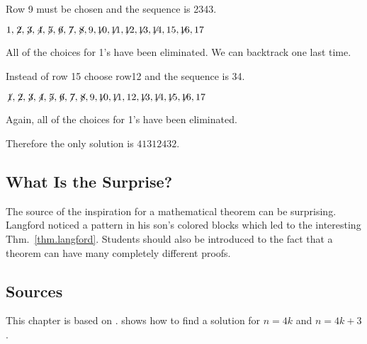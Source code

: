 \noindent Row 9 must be chosen and the sequence is 2{}34{}3.

$1,\not\! 2,\not\! 3,\not\! 4,\not\! 5,\not\! 6,\not\! 7,\not\! 8,9,\not\!\! 10,\not\!\! 11,\not\!\! 12,\not\!\! 13,\not\!\! 14,15,\not\!\! 16,17$

\noindent All of the choices for 1's have been eliminated. We can backtrack one last time. 

\smallskip

\noindent Instead of row 15 choose row12 and the sequence is 3{}4\textvisiblespace {}.

$\not\! 1,\not\! 2,\not\! 3,\not\! 4,\not\! 5,\not\! 6,\not\! 7,\not\! 8,9,\not\!\! 10,\not\!\! 11,12,\not\!\! 13,\not\!\! 14,\not\!\! 15,\not\!\! 16,17$

\noindent Again, all of the choices for 1's have been eliminated.

\medskip

\noindent Therefore the only solution is $41312432$.

\subsection*{What Is the Surprise?}

The source of the inspiration for a mathematical theorem can be surprising. Langford noticed a pattern in his son's colored blocks which led to the interesting Thm.~\ref{thm.langford}. Students should also be introduced to the fact that a theorem  can have many completely different proofs.

\subsection*{Sources}
This chapter is based on \cite{miller}. \cite{davies} shows how to find a solution for $n=4k$ and $n=4k+3$.
